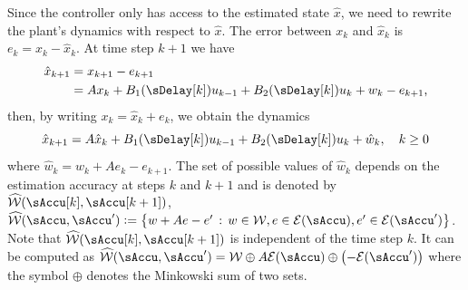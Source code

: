 Since the controller only has access to the estimated state $\hat{x}$, we need
to rewrite the plant's dynamics with respect to $\hat{x}$. The error
between $ $$x_{k}$ and $\hat{x}_{k}$ is $e_{k}=x_{k}-\hat{x}_{k}$.
At time step $k+1$ we have
\begin{align*}
\hat{x}_{k+1} & =x_{k+1}-e_{k+1}\\
 & =Ax_{k}+B_{1}(\sDelay[k])u_{k-1}+B_{2}(\sDelay[k])u_{k}+w_{k}-e_{k+1}\text{,}
\end{align*}
 then, by writing $x_{k}=\hat{x}_{k}+e_{k}$, we obtain the dynamics
\begin{equation}
\hat{x}_{k+1}=A\hat{x}_{k}+B_{1}(\sDelay[k])u_{k-1}+B_{2}(\sDelay[k])u_{k}+\hat{w}_{k},\quad k\geq0\label{eq:estimator-dynamics}
\end{equation}
 where $\hat{w}_{k}=w_{k}+Ae_{k}-e_{k+1}$.
The set of possible values of $\hat{w}_{k}$
depends on the estimation accuracy at steps $k$ and $k+1$ and is
denoted by $\WhSet(\sAccu[k],\sAccu[k+1])$, \ie
$\WhSet(\sAccu,\sAccu')\definedas\left\{ w+Ae-e'\SuchThat w\in\WSet,e\in\ESet(\sAccu),e'\in\ESet(\sAccu')\right\}$.
Note that %
$\WhSet(\sAccu[k],\sAccu[k+1])$ is independent
of the time step $k$. %
It can be computed as $\WhSet(\sAccu,\sAccu')=\WSet\oplus A\ESet(\sAccu)\oplus\left(-\ESet(\sAccu')\right)$
where the symbol $\oplus$ denotes the Minkowski sum of two sets.


